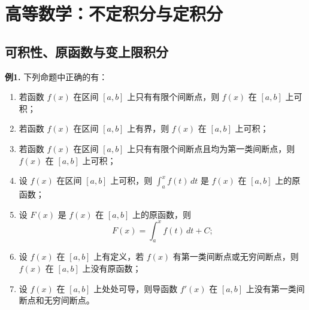 \chapter{高等数学：不定积分与定积分}

\section{可积性、原函数与变上限积分}

\begin{problemblock}
\textbf{例1.} 下列命题中正确的有：
\begin{enumerate}[label=(\arabic*), leftmargin=2.2em]
\item 若函数 \(f(x)\) 在区间 \([a,b]\) 上只有有限个间断点，则 \(f(x)\) 在 \([a,b]\) 上可积；
\item 若函数 \(f(x)\) 在区间 \([a,b]\) 上有界，则 \(f(x)\) 在 \([a,b]\) 上可积；
\item 若函数 \(f(x)\) 在区间 \([a,b]\) 上只有有限个间断点且均为第一类间断点，则 \(f(x)\) 在 \([a,b]\) 上可积；
\item 设 \(f(x)\) 在区间 \([a,b]\) 上可积，则 \(\displaystyle\int_a^x f(t)\,dt\) 是 \(f(x)\) 在 \([a,b]\) 上的原函数；
\item 设 \(F(x)\) 是 \(f(x)\) 在 \([a,b]\) 上的原函数，则
\[
F(x)=\int_a^x f(t)\,dt+C;
\]
\item 设 \(f(x)\) 在 \([a,b]\) 上有定义，若 \(f(x)\) 有第一类间断点或无穷间断点，则 \(f(x)\) 在 \([a,b]\) 上没有原函数；
\item 设 \(f(x)\) 在 \([a,b]\) 上处处可导，则导函数 \(f'(x)\) 在 \([a,b]\) 上没有第一类间断点和无穷间断点。
\end{enumerate}
\end{problemblock}
